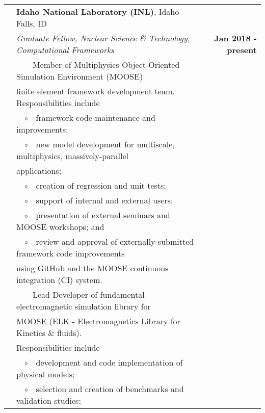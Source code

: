 \documentclass{article}
\newcommand{\tabitem}{~~\textbullet~~}
\newcommand{\tabitemii}{~~$\circ$~~}
\begin{document}
\begin{tabularx}{\textwidth}{l X r}
	\hspace{2em} & \textbf{Idaho National Laboratory (INL)}, Idaho Falls, ID & \\
	& \textit{Graduate Fellow, Nuclear Science \& Technology, Computational Frameworks} & \textbf{Jan 2018 - present} \\
	& \tabitem Member of Multiphysics Object-Oriented Simulation Environment (MOOSE) & \\
	& \hspace{1.5em} finite element framework development team. Responsibilities include & \\
		& \hspace{1.5em} \tabitemii framework code maintenance and improvements; & \\
		& \hspace{1.5em} \tabitemii new model development for multiscale, multiphysics, massively-parallel & \\
		& \hspace{3.4em} applications; & \\
		& \hspace{1.5em} \tabitemii creation of regression and unit tests; & \\
		& \hspace{1.5em} \tabitemii support of internal and external users; & \\
		& \hspace{1.5em} \tabitemii presentation of external seminars and MOOSE workshops; and & \\
		& \hspace{1.5em} \tabitemii review and approval of externally-submitted framework code improvements & \\
		& \hspace{3.4em}  using GitHub and the MOOSE continuous integration (CI) system. & \\
	& \tabitem Lead Developer of fundamental electromagnetic simulation library for & \\
	& \hspace{1.5em} MOOSE (ELK - Electromagnetics Library for Kinetics \& fluids). & \\
	& \hspace{1.5em} Responsibilities include & \\
		& \hspace{1.5em} \tabitemii development and code implementation of physical models; & \\
		& \hspace{1.5em} \tabitemii selection and creation of benchmarks and validation studies; & \\

\end{tabularx}
\end{document}
